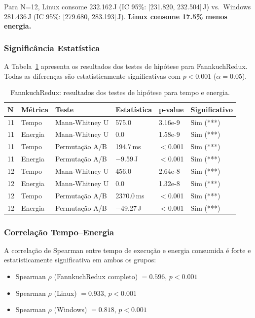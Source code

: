 \documentclass[12pt,a4paper]{article}
\begin{document}
Para N=12, Linux consome 232.162\,J (IC 95\%: [231.820, 232.504]\,J) vs.\
Windows 281.436\,J (IC 95\%: [279.680, 283.193]\,J).
\textbf{Linux consome 17.5\% menos energia.}

\subsubsection{Significância Estatística}

A Tabela~\ref{tab:testes_fr} apresenta os resultados dos testes de hipótese
para FannkuchRedux.
Todas as diferenças são estatisticamente significativas com $p < 0.001$
($\alpha = 0.05$).

\begin{table}[H]
  \centering
  \caption{FannkuchRedux: resultados dos testes de hipótese para tempo e
    energia.}
  \label{tab:testes_fr}
  \begin{tabular}{llllll}
    \toprule
    \textbf{N} & \textbf{Métrica} & \textbf{Teste} & \textbf{Estatística} &
    \textbf{p-value} & \textbf{Significativo} \\
    \midrule
    11 & Tempo   & Mann-Whitney U  & 575.0          & 3.16e-9  & Sim (***) \\
    11 & Energia & Mann-Whitney U  & 0.0            & 1.58e-9  & Sim (***) \\
    11 & Tempo   & Permutação A/B  & 194.7\,ms      & $<$0.001 & Sim (***) \\
    11 & Energia & Permutação A/B  & $-$9.59\,J     & $<$0.001 & Sim (***) \\
    12 & Tempo   & Mann-Whitney U  & 456.0          & 2.64e-8  & Sim (***) \\
    12 & Energia & Mann-Whitney U  & 0.0            & 1.32e-8  & Sim (***) \\
    12 & Tempo   & Permutação A/B  & 2370.0\,ms     & $<$0.001 & Sim (***) \\
    12 & Energia & Permutação A/B  & $-$49.27\,J    & $<$0.001 & Sim (***) \\
    \bottomrule
  \end{tabular}
\end{table}

\subsubsection{Correlação Tempo--Energia}

A correlação de Spearman entre tempo de execução e energia consumida é forte e
estatisticamente significativa em ambos os grupos:
\begin{itemize}
  \item Spearman $\rho$ (FannkuchRedux completo) $= 0.596$, $p < 0.001$
  \item Spearman $\rho$ (Linux) $= 0.933$, $p < 0.001$
  \item Spearman $\rho$ (Windows) $= 0.818$, $p < 0.001$
\end{itemize}
\end{document}
